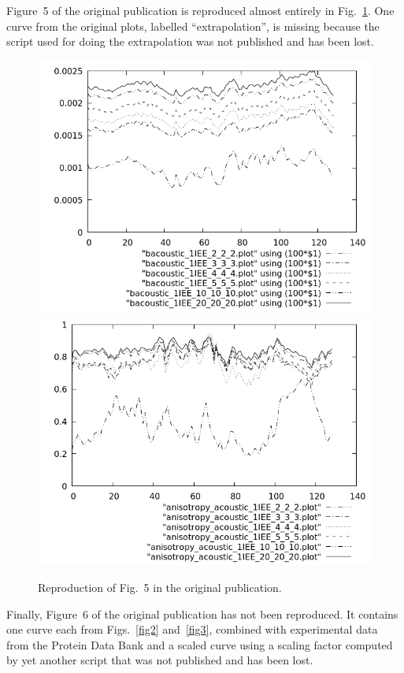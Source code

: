 Figure~5 of the original publication is reproduced almost entirely in Fig.~\ref{fig5}. One curve from the original plots, labelled ``extrapolation'', is missing because the script used for doing the extrapolation was not published and has been lost.
\begin{figure}
\includegraphics[width=.9\textwidth]{../reproduction/fig5a.png}
\includegraphics[width=.9\textwidth]{../reproduction/fig5b.png}
\caption{Reproduction of Fig.~5 in the original publication.}
\label{fig5}
\end{figure}

Finally, Figure~6 of the original publication has not been reproduced. It contains one curve each from Figs.~\ref{fig2} and~\ref{fig3}, combined with experimental data from the Protein Data Bank and a scaled curve using a scaling factor computed by yet another script that was not published and has been lost.

